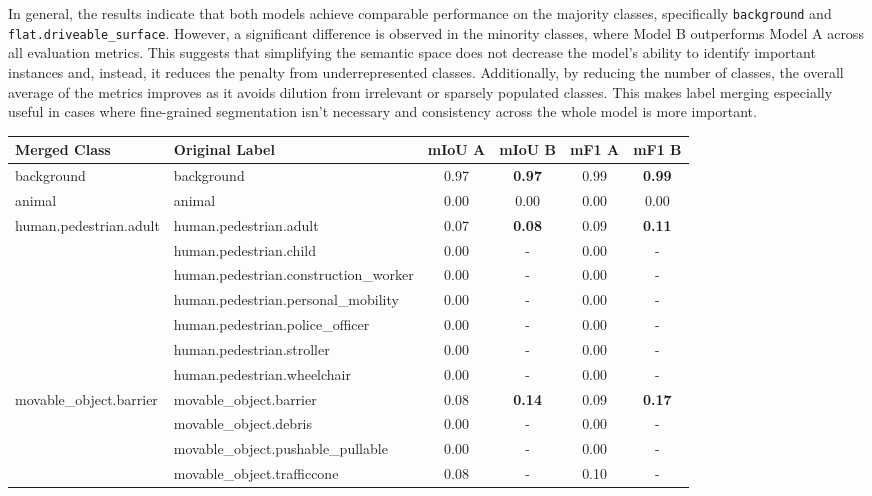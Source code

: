 In general, the results indicate that both models achieve comparable performance on the majority classes, specifically \texttt{background} and \texttt{flat.driveable\_surface}. However, a significant difference is observed in the minority classes, where Model B outperforms Model A across all evaluation metrics. This suggests that simplifying the semantic space does not decrease the model's ability to identify important instances and, instead, it reduces the penalty from underrepresented classes. Additionally, by reducing the number of classes, the overall average of the metrics improves as it avoids dilution from irrelevant or sparsely populated classes. This makes label merging especially useful in cases where fine-grained segmentation isn't necessary and consistency across the whole model is more important.

\begin{table}[ht]
    \centering
    \tiny
    \begin{tabular}{llcccc}
    \toprule
    \textbf{Merged Class} & \textbf{Original Label} & \textbf{mIoU A} & \textbf{mIoU B} & \textbf{mF1 A} & \textbf{mF1 B} \\
    \midrule
    background & background & 0.97 & \textbf{0.97} & 0.99 & \textbf{0.99} \\
    \midrule
    animal & animal & 0.00 & 0.00 & 0.00 & 0.00 \\
    \midrule
    human.pedestrian.adult & human.pedestrian.adult & 0.07 & \textbf{0.08} & 0.09 & \textbf{0.11} \\
     & human.pedestrian.child & 0.00 & - & 0.00 & - \\
     & human.pedestrian.construction\_worker & 0.00 & - & 0.00 & - \\
     & human.pedestrian.personal\_mobility & 0.00 & - & 0.00 & - \\
     & human.pedestrian.police\_officer & 0.00 & - & 0.00 & - \\
     & human.pedestrian.stroller & 0.00 & - & 0.00 & - \\
     & human.pedestrian.wheelchair & 0.00 & - & 0.00 & - \\
    \midrule
    movable\_object.barrier & movable\_object.barrier & 0.08 & \textbf{0.14} & 0.09 & \textbf{0.17} \\
     & movable\_object.debris & 0.00 & - & 0.00 & - \\
     & movable\_object.pushable\_pullable & 0.00 & - & 0.00 & - \\
     & movable\_object.trafficcone & 0.08 & - & 0.10 & - \\

\end{tabular}
\end{table}
